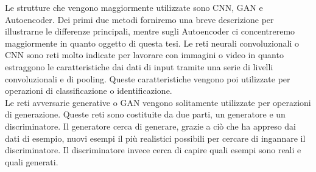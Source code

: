 Le strutture che vengono maggiormente utilizzate sono CNN, GAN e Autoencoder. Dei primi due metodi forniremo una breve descrizione per illustrarne le differenze principali, mentre sugli Autoencoder ci concentreremo maggiormente in quanto oggetto di questa tesi.
Le reti neurali convoluzionali o CNN sono reti molto indicate per lavorare con immagini o video in quanto estraggono le caratteristiche dai dati di input tramite una serie di livelli convoluzionali e di pooling. Queste caratteristiche vengono poi utilizzate per operazioni di classificazione o identificazione.\\
Le reti avversarie generative o GAN vengono solitamente utilizzate per operazioni di generazione. Queste reti sono costituite da due parti, un generatore e un discriminatore. Il generatore cerca di generare, grazie a ciò che ha appreso dai dati di esempio, nuovi esempi il più realistici possibili per cercare di ingannare il discriminatore. Il discriminatore invece cerca di capire quali esempi sono reali e quali generati. 


